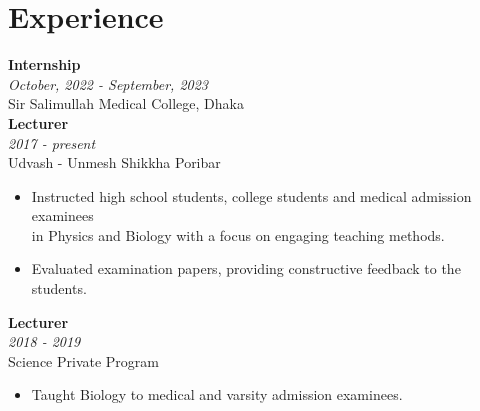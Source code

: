 \documentclass[a4paper,11pt]{article}
\newcommand{\resumeentry}[2]{
    \textbf{#1} \\
    \textit{#2}
}
\begin{document}
\begin{minipage}[t][6cm]{0.98\textwidth}
\section*{Experience}
\resumeentry{Internship}{October, 2022 - September, 2023}\\ Sir Salimullah Medical College, Dhaka \vspace{0.2cm} \\
\resumeentry{Lecturer}{2017 - present}\\ Udvash - Unmesh Shikkha Poribar
\begin{itemize}[left=0em, itemsep=0pt, parsep=0pt]
  \item Instructed high school students, college students and medical admission examinees \\
  in Physics and Biology with a focus on engaging teaching methods.
  \item Evaluated examination papers, providing constructive feedback to the students.
\end{itemize}
\resumeentry{Lecturer}{2018 - 2019}\\ Science Private Program
\begin{itemize}[left=0em, itemsep=0pt, parsep=-10pt]
  \item Taught Biology to medical and varsity admission examinees.
\end{itemize}
\end{minipage}
\end{document}
